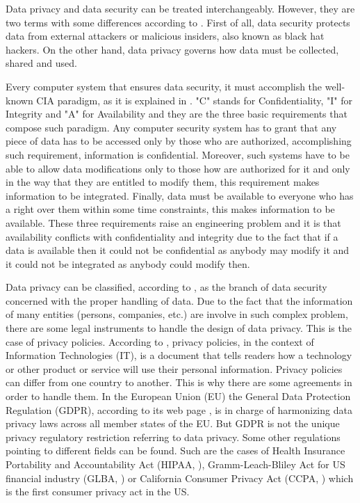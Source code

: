 Data privacy and data security can be treated interchangeably. However, they are two terms with some differences according to \cite{dataprivacy}. First of all, data security protects data from external attackers or malicious insiders, also known as black hat hackers. On the other hand, data privacy governs how data must be collected, shared and used.

Every computer system that ensures data security, it must accomplish the well-known CIA paradigm, as it is explained in \cite{computersecurityslides}. "C" stands for Confidentiality, "I" for Integrity and "A" for Availability and they are the three basic requirements that compose such paradigm. Any computer security system has to grant that any piece of data has to be accessed only by those who are authorized, accomplishing such requirement, information is confidential. Moreover, such systems have to be able to allow data modifications only to those how are authorized for it and only in the way that they are entitled to modify them, this requirement makes information to be integrated. Finally, data must be available to everyone who has a right over them within some time constraints, this makes information to be available. These three requirements raise an engineering problem and it is that availability conflicts with confidentiality and integrity due to the fact that if a data is available then it could not be confidential as anybody may modify it and it could not be integrated as anybody could modify then.

Data privacy can be classified, according to \cite{dataprivacy}, as the branch of data security concerned with the proper handling of data. Due to the fact that the information of many entities (persons, companies, etc.) are involve in such complex problem, there are some legal instruments to handle the design of data privacy. This is the case of privacy policies. According to \cite{privpoldef}, privacy policies, in the context of Information Technologies (IT), is a document that tells readers how a technology or other product or service will use their personal information. Privacy policies can differ from one country to another. This is why there are some agreements in order to handle them. In the European Union (EU) the General Data Protection Regulation (GDPR), according to its web page \cite{gdprwebpage}, is in charge of harmonizing data privacy laws across all member states of the EU. But GDPR is not the unique privacy regulatory restriction referring to data privacy. Some other regulations pointing to different fields can be found. Such are the cases of Health Insurance Portability and Accountability Act (HIPAA, \cite{hipaablog}), Gramm-Leach-Bliley Act for US financial industry (GLBA, \cite{glbablog}) or California Consumer Privacy Act (CCPA, \cite{ccpablog}) which is the first consumer privacy act in the US.

